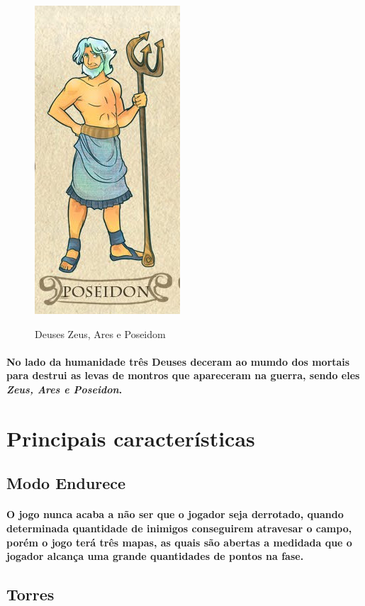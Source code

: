 \documentclass[11pt]{article} %
\begin{document}
\begin{figure}[!htp]
\includegraphics[scale=0.3]{res/poseidom.png} \quad
\label{Nave Espacial}
\center
\caption{Deuses Zeus, Ares e Poseidom}

\end{figure}

\paragraph{}\textbf{No lado da humanidade três Deuses deceram ao mumdo dos mortais para destrui as levas de montros que apareceram na guerra, sendo eles \textit{\textbf{Zeus}, \textbf{Ares} e \textbf{Poseidon}}.}

\section*{Principais características}
\subsection{Modo Endurece}\paragraph{O jogo nunca acaba a não ser que o jogador seja derrotado, quando determinada quantidade de inimigos conseguirem atravesar o campo, porém o jogo terá três mapas, as quais são abertas a medidada que o jogador alcança uma grande quantidades de pontos na fase.} 

\subsection{Torres}
\end{document}
